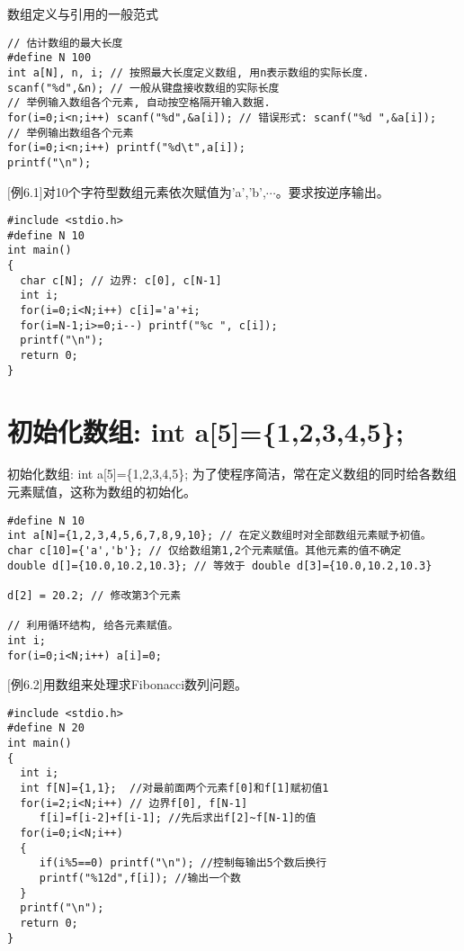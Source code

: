 \begin{frame}[fragile]{数组定义与引用的一般范式}
\begin{lstlisting}
// 估计数组的最大长度
#define N 100 
int a[N], n, i; // 按照最大长度定义数组, 用n表示数组的实际长度.
scanf("%d",&n); // 一般从键盘接收数组的实际长度
// 举例输入数组各个元素, 自动按空格隔开输入数据.
for(i=0;i<n;i++) scanf("%d",&a[i]); // 错误形式: scanf("%d ",&a[i]);
// 举例输出数组各个元素
for(i=0;i<n;i++) printf("%d\t",a[i]);
printf("\n");
\end{lstlisting}
\end{frame}

\begin{frame}
$[$例6.1$]$对10个字符型数组元素依次赋值为'a','b',$\cdots$。要求按逆序输出。
\pause
\begin{lstlisting}
#include <stdio.h>
#define N 10
int main()
{
  char c[N]; // 边界: c[0], c[N-1]
  int i;
  for(i=0;i<N;i++) c[i]='a'+i; 
  for(i=N-1;i>=0;i--) printf("%c ", c[i]);
  printf("\n");
  return 0;
}
\end{lstlisting}
\end{frame}

\section{初始化数组: int a[5]=\{1,2,3,4,5\};}

\begin{frame}{初始化数组: int a[5]=\{1,2,3,4,5\};}
为了使程序简洁，常在定义数组的同时给各数组元素赋值，这称为数组的初始化。
\begin{lstlisting}
#define N 10
int a[N]={1,2,3,4,5,6,7,8,9,10}; // 在定义数组时对全部数组元素赋予初值。
char c[10]={'a','b'}; // 仅给数组第1,2个元素赋值。其他元素的值不确定
double d[]={10.0,10.2,10.3}; // 等效于 double d[3]={10.0,10.2,10.3}

d[2] = 20.2; // 修改第3个元素

// 利用循环结构, 给各元素赋值。
int i;
for(i=0;i<N;i++) a[i]=0;
\end{lstlisting}
\end{frame}

\begin{frame}
$[$例6.2$]$用数组来处理求Fibonacci数列问题。
\begin{lstlisting}
#include <stdio.h>
#define N 20
int main()
{
  int i;
  int f[N]={1,1};  //对最前面两个元素f[0]和f[1]赋初值1
  for(i=2;i<N;i++) // 边界f[0], f[N-1]
     f[i]=f[i-2]+f[i-1]; //先后求出f[2]~f[N-1]的值
  for(i=0;i<N;i++)
  {
     if(i%5==0) printf("\n"); //控制每输出5个数后换行
     printf("%12d",f[i]); //输出一个数
  }
  printf("\n");
  return 0;
}
\end{lstlisting}
\end{frame}

